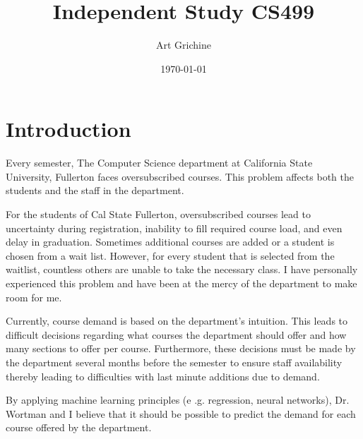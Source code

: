 \documentclass[12pt]{article}
\begin{document}
\title{Independent Study CS499}
\author{Art Grichine}
\date{\today}

\maketitle	


\section*{Introduction}
Every semester, The Computer Science department at California State University, Fullerton faces 
oversubscribed courses. This problem affects both the students and the staff in the department. 

For the students of Cal State Fullerton, oversubscribed courses lead to uncertainty during registration, 
inability to fill required course load, and even delay in graduation. Sometimes additional courses are 
added or a student is chosen from a wait list. However, for every student that is selected from the 
waitlist, countless others are unable to take the necessary class. I have personally experienced this 
problem and have been at the mercy of the department to make room for me.

Currently, course demand is based on the department's intuition. This leads to difficult decisions 
regarding what courses the department should offer and how many sections to offer per course. 
Furthermore, these decisions must be made by the department several months before the semester 
to ensure staff availability thereby leading to difficulties with last minute additions due to demand.

By applying machine learning principles (e .g. regression, neural networks), Dr. Wortman and I believe 
that it should be possible to predict the demand for each course offered by the department.

\end{document}
